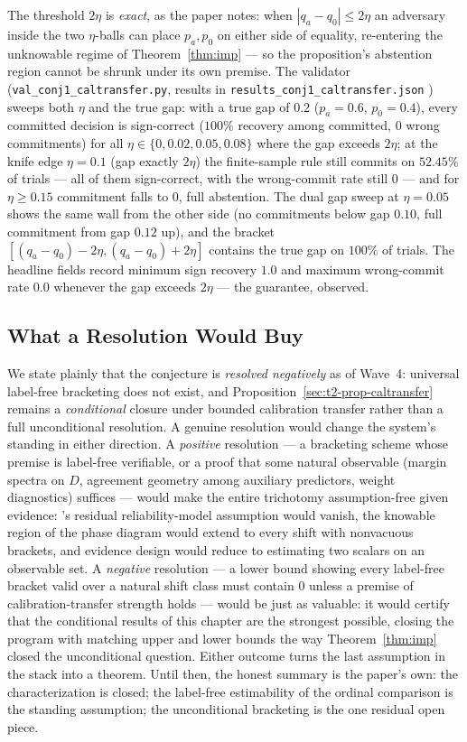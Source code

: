 The threshold $2\eta$ is \emph{exact}, as the paper notes: when $|q_a-q_0|\le2\eta$ an
adversary inside the two $\eta$-balls can place $p_a,p_0$ on either side of equality,
re-entering the unknowable regime of Theorem~\ref{thm:imp} --- so the proposition's
abstention region cannot be shrunk under its own premise. The validator
(\texttt{val\_conj1\_caltransfer.py}, results in
\texttt{results\_conj1\_caltransfer.json} \cite{kbound2026repo}) sweeps both $\eta$ and
the true gap: with a true gap of $0.2$ ($p_a=0.6$, $p_0=0.4$), every committed decision
is sign-correct ($100\%$ recovery among committed, $0$ wrong commitments) for all
$\eta\in\{0,0.02,0.05,0.08\}$ where the gap exceeds $2\eta$; at the knife edge
$\eta=0.1$ (gap exactly $2\eta$) the finite-sample rule still commits on $52.45\%$ of
trials --- all of them sign-correct, with the wrong-commit rate still $0$ --- and for
$\eta\ge0.15$ commitment falls to $0$, full abstention. The dual gap sweep at
$\eta=0.05$ shows the same wall from the other side (no commitments below gap $0.10$,
full commitment from gap $0.12$ up), and the bracket
$[(q_a-q_0)-2\eta,(q_a-q_0)+2\eta]$ contains the true gap on $100\%$ of trials. The
headline fields record minimum sign recovery $1.0$ and maximum wrong-commit rate $0.0$
whenever the gap exceeds $2\eta$ --- the guarantee, observed.

\subsection{What a Resolution Would Buy}
\label{sec:t2-open-payoff}

We state plainly that the conjecture is \emph{resolved negatively} as of Wave~4:
universal label-free bracketing does not exist, and Proposition~\ref{sec:t2-prop-caltransfer}
remains a \emph{conditional} closure under bounded calibration transfer rather than a
full unconditional resolution. A
genuine resolution would change the system's standing in either direction. A
\emph{positive} resolution --- a bracketing scheme whose premise is label-free
verifiable, or a proof that some natural observable (margin spectra on $D$, agreement
geometry among auxiliary predictors, weight diagnostics) suffices --- would make the
entire trichotomy assumption-free given evidence: \KGA's residual reliability-model
assumption would vanish, the knowable region of the phase diagram would extend to
every shift with nonvacuous brackets, and evidence design would reduce to estimating
two scalars on an observable set. A \emph{negative} resolution --- a lower bound
showing every label-free bracket valid over a natural shift class must contain $0$
unless a premise of calibration-transfer strength holds --- would be just as valuable:
it would certify that the conditional results of this chapter are the strongest
possible, closing the program with matching upper and lower bounds the way
Theorem~\ref{thm:imp} closed the unconditional question. Either outcome turns the last
assumption in the stack into a theorem. Until then, the honest summary is the paper's
own: the characterization is closed; the label-free estimability of the ordinal
comparison is the standing assumption; the unconditional bracketing is the one residual
open piece.

